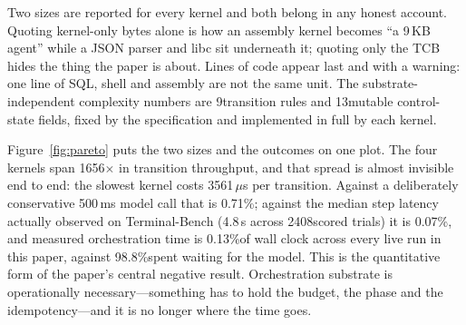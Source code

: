 \documentclass[11pt,a4paper]{article}
\begin{document}
Two sizes are reported for every kernel and both belong in any honest account.
Quoting kernel-only bytes alone is how an assembly kernel becomes ``a 9\,KB
agent'' while a JSON parser and libc sit underneath it; quoting only the TCB
hides the thing the paper is about. Lines of code appear last and with a
warning: one line of SQL, shell and assembly are not the same unit. The
substrate-independent complexity numbers are 9transition rules and
13mutable control-state fields, fixed by the specification and
implemented in full by each kernel.

\begin{table}[h]\centering\small
\caption{Where the wall clock and the tokens go. $T_{orch}$ is everything that
is neither the model call nor the tool: prompt rendering, the ABI round trip,
and the kernel.}
\label{tab:cost}
\end{table}

Figure~\ref{fig:pareto} puts the two sizes and the outcomes on one plot.
The four kernels span 1656$\times$ in transition throughput, and
that spread is almost invisible end to end: the slowest kernel costs
3561\,$\mu$s per transition. Against a deliberately conservative
500\,ms model call that is 0.71\%; against the median step latency
actually observed on Terminal-Bench (4.8\,s across 2408scored
trials) it is 0.07\%,
and measured orchestration time is 0.13\%of wall clock across every
live run in this paper, against 98.8\%spent waiting for the model.
This is the quantitative form of the paper's central negative result.
Orchestration substrate is operationally necessary---something has to hold the
budget, the phase and the idempotency---and it is no longer where the time
goes.
\end{document}
